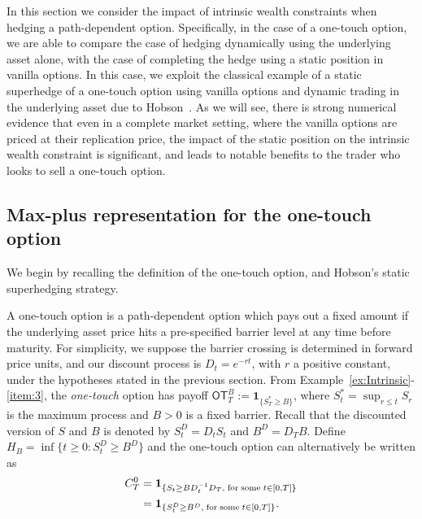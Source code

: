 \documentclass[a4paper]{amsart}
\theoremstyle{definition}
\theoremstyle{remark}
\numberwithin{equation}{section}
\newcommand{\ind}{\boldsymbol{1}}
\newcommand{\OT}{\mathsf{OT}}
\begin{document}
In this section we consider the impact of intrinsic wealth constraints when hedging a path-dependent option. Specifically, in the case of a one-touch option, we are able to compare the case of hedging dynamically using the underlying asset alone, with the case of completing the hedge using a static position in vanilla options. In this case, we exploit the classical example of a static superhedge of a one-touch option using vanilla options and dynamic trading in the underlying asset due to Hobson~\cite{Hobson:1998aa}. As we will see, there is strong numerical evidence that even in a complete market setting, where the vanilla options are priced at their replication price, the impact of the static position on the intrinsic wealth constraint is significant, and leads to notable benefits to the trader who looks to sell a one-touch option.

\subsection{Max-plus representation for the one-touch option}

We begin by recalling the definition of the one-touch option, and Hobson's static superhedging strategy.

A one-touch option is a path-dependent option which pays out a fixed amount if the underlying asset price hits a pre-specified barrier level at any time before maturity. For simplicity, we suppose the barrier crossing is determined in forward price units, and our discount process is $D_t=e^{-rt}$, with $r$ a positive constant, under the hypotheses stated in the previous section. From Example~\ref{ex:Intrinsic}-\ref{item:3}, the \emph{one-touch} option has payoff $\OT^B_T := \ind_{\{S_T^* \ge B\}}$, where $S_t^* = \sup_{r \le t} S_r$ is the maximum process and $B >0$ is a fixed barrier. Recall that the discounted version of $S$ and $B$ is denoted by $S^D_t=D_tS_t$  and $B^D=D_T B$. Define $H_{B}=\inf\{t\geq 0: S_t^D\geq B^D\}$ and the one-touch option can alternatively be written as
\begin{align*}
    C^0_T&=\ind_{\{S_t\geq   BD_t^{-1}D_T,\;\text{for\;some}\;  t\in[0,T]\}}\\
    &=\ind_{\{S_t^D\geq   B^D,\;\text{for\;some}\;  t\in[0,T]\}}.
\end{align*}
\end{document}
